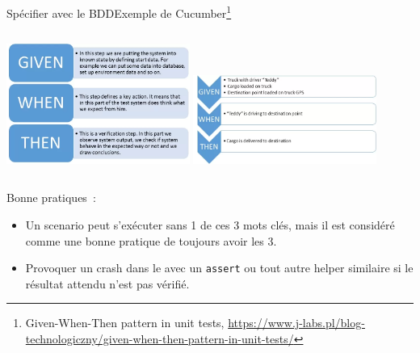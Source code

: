 \documentclass{beamer}
\begin{document}
    \begin{frame}{Spécifier avec le BDD}{Exemple de Cucumber\footnote{Given-When-Then pattern in unit tests, \url{https://www.j-labs.pl/blog-technologiczny/given-when-then-pattern-in-unit-tests/}}}
        \transdissolve
        \begin{columns}
            \centering
            \includegraphics[width=6cm]{image/given-when-then}
            \centering
            \includegraphics[width=6cm]{image/given-when-then-exemple}
        \end{columns}
        Bonne pratiques~:
        \begin{itemize}
            \item Un scenario peut s'exécuter sans 1 de ces 3 mots clés, mais il est considéré comme une bonne pratique de toujours avoir les 3.

            \item Provoquer un crash dans le  avec un \lstinline{assert} ou tout autre helper similaire si le résultat attendu n'est pas vérifié.
        \end{itemize}
    \end{frame}
\end{document}
